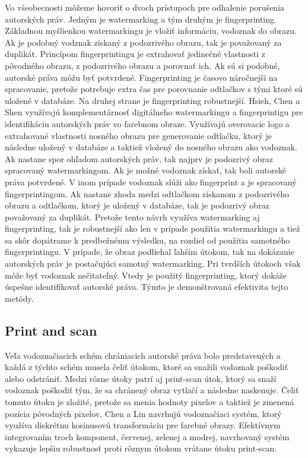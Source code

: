 Vo všeobecnosti môžeme hovoriť o dvoch prístupoch pre odhalenie porušenia autorských práv. Jedným je watermarking a tým druhým je fingerprinting. Základnou myšlienkou watermarkingu je vložiť informáciu, vodoznak do obrazu. Ak je podobný vodznak získaný z podozrivého obrazu, tak je považovaný za duplikát. Princípom fingerprintingu je extrahovať jedinečné vlastnosti z pôvodného obrazu, z podozrivého obrazu a porovnať ich. Ak sú si podobné, autorské práva môžu byť potvrdené. Fingerprinting je časovo náročnejší na spracovanie, pretože potrebuje extra čas pre porovnanie odtlačkov s tými ktoré sú uložené v databáze. Na druhej strane je fingerprinting robustnejší. \cite{Hsieh2014}
Hsieh, Chen a Shen \cite{Hsieh2014} využívajú komplementárnosť digitálneho watermarkingu a fingerprintigu pre identifikáciu autorských práv vo farebnom obraze. Využívajú overovacie logo a extrahované vlastnosti nosného obrazu pre generovanie odtlačku, ktorý je následne uložený v databáze a taktiež vložený do nosného obrazu ako vodoznak. Ak nastane spor ohľadom autorských práv, tak najprv je podozrivý obraz spracovaný watermarkingom. Ak je možné vodoznak získať, tak boli autorské práva potvrdené. V inom prípade vodoznak slúži ako fingerprint a je spracovaný fingerprintingom. Ak nastane zhoda medzi odtlačkom získanom z podozrivého obrazu a odtlačkom, ktorý je uložený v databáze, tak je podozrivý obraz považovaný za duplikát. Pretože tento návrh využíva watermarking aj fingerprinting, tak je robustnejší ako len v prípade použitia watermarkingu a tiež sa skôr dopátrame k predbežnému výsledku, na rozdiel od použitia samotného fingerprintingu. V prípade, že obraz podliehal ľahším útokom, tak na dokázanie autorských práv je postačujúci samotný watermarking. Pri tvrdších útokoch však môže byť vodoznak nečitateľný. Vtedy je použitý fingerprinting, ktorý dokáže úspešne identifikovať autorské práva. Týmto je demonštrovaná efektivita tejto metódy.

\subsection{Print and scan}
Veľa vodoznačiacich schém chrániacich autorské práva bolo predstavených a každá z týchto schém musela čeliť útokom, ktoré sa snažili vodoznak poškodiť alebo odstrániť. Medzi rôzne útoky patrí aj print-scan útok, ktorý sa snaží vodoznak poškodiť tým, že sa chránený obraz vytlačí a následne naskenuje. Čeliť tomuto útoku je zložité, pretože sa menia hodnoty pixelov a taktiež je zmenená pozícia pôvodných pixelov. Chen a Lin \cite{Chen} navrhujú vodoznačiaci systém, ktorý využíva diskrétnu kosínusovú transformáciu pre farebné obrazy. Efektívnym integrovaním troch komponent, červenej, zelenej a modrej, navrhovaný systém vykazuje lepšiu robustnosť proti rôznym útokom vrátane útoku print-scan.

